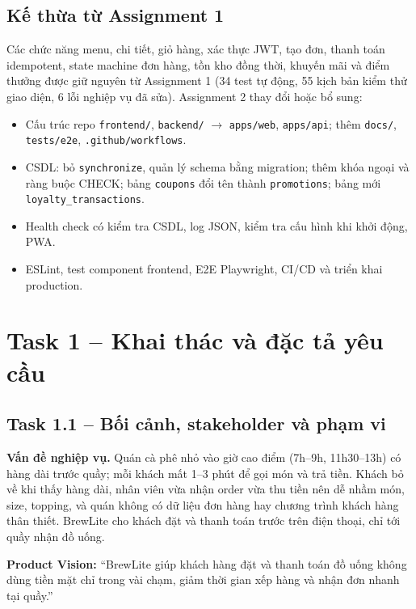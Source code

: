\documentclass[a4paper]{article}
\newcommand{\st}[1]{\texttt{#1}}
\newcommand{\ra}{\ensuremath{\rightarrow}}
\begin{document}
\subsection{Kế thừa từ Assignment 1}
Các chức năng menu, chi tiết, giỏ hàng, xác thực JWT, tạo đơn, thanh toán idempotent, state machine đơn hàng, tồn kho đồng thời, khuyến mãi và điểm thưởng được giữ nguyên từ Assignment 1 (34 test tự động, 55 kịch bản kiểm thử giao diện, 6 lỗi nghiệp vụ đã sửa). Assignment 2 thay đổi hoặc bổ sung:
\begin{itemize}
  \item Cấu trúc repo \st{frontend/}, \st{backend/} \ra{} \st{apps/web}, \st{apps/api}; thêm \st{docs/}, \st{tests/e2e}, \st{.github/workflows}.
  \item CSDL: bỏ \st{synchronize}, quản lý schema bằng migration; thêm khóa ngoại và ràng buộc CHECK; bảng \st{coupons} đổi tên thành \st{promotions}; bảng mới \st{loyalty\_transactions}.
  \item Health check có kiểm tra CSDL, log JSON, kiểm tra cấu hình khi khởi động, PWA.
  \item ESLint, test component frontend, E2E Playwright, CI/CD và triển khai production.
\end{itemize}

\section{Task 1 -- Khai thác và đặc tả yêu cầu}

\subsection{Task 1.1 -- Bối cảnh, stakeholder và phạm vi}
\textbf{Vấn đề nghiệp vụ.} Quán cà phê nhỏ vào giờ cao điểm (7h--9h, 11h30--13h) có hàng dài trước quầy; mỗi khách mất 1--3 phút để gọi món và trả tiền. Khách bỏ về khi thấy hàng dài, nhân viên vừa nhận order vừa thu tiền nên dễ nhầm món, size, topping, và quán không có dữ liệu đơn hàng hay chương trình khách hàng thân thiết. BrewLite cho khách đặt và thanh toán trước trên điện thoại, chỉ tới quầy nhận đồ uống.

\textbf{Product Vision:} ``BrewLite giúp khách hàng đặt và thanh toán đồ uống không dùng tiền mặt chỉ trong vài chạm, giảm thời gian xếp hàng và nhận đơn nhanh tại quầy.''
\end{document}
